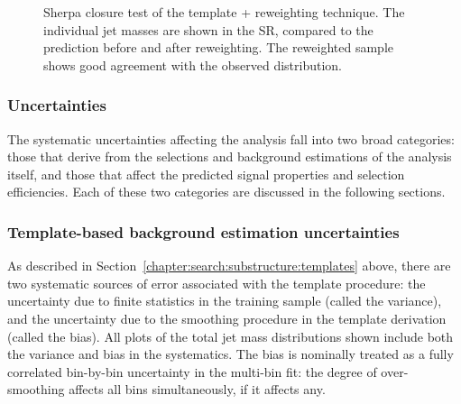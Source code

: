 \begin{figure}[!ht]
  \centering
  
    
  \caption{Sherpa closure test of the template + reweighting technique. The individual jet masses are shown in the SR, compared to the prediction before and after reweighting. The reweighted sample shows good agreement with the observed distribution.}
               
  \label{fig:search:search:mccheck:4jSherpa}
\end{figure}



\subsubsection{Uncertainties}


The systematic uncertainties affecting the analysis fall into two broad categories: those that derive from the selections and background estimations of the analysis itself, and those that affect the predicted signal properties and selection efficiencies. Each of these two categories are discussed in the following sections.

\subsubsection{Template-based background estimation uncertainties}


As described in Section~\ref{chapter:search:substructure:templates} above, there are two systematic sources of error associated with the template procedure: the uncertainty due to finite statistics in the training sample (called the variance), and the uncertainty due to the smoothing procedure in the template derivation (called the bias). All plots of the total jet mass distributions shown include both the variance and bias in the systematics. The bias is nominally treated as a fully correlated bin-by-bin uncertainty in the multi-bin fit: the degree of over-smoothing affects all bins simultaneously, if it affects any.


